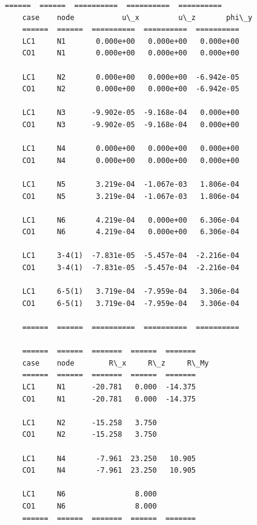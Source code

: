 \begin{Verbatim}[commandchars=\\\{\}]
    ======  ======  ==========  ==========  ==========
    case    node           u\_x         u\_z       phi\_y
    ======  ======  ==========  ==========  ==========
    LC1     N1       0.000e+00   0.000e+00   0.000e+00
    CO1     N1       0.000e+00   0.000e+00   0.000e+00

    LC1     N2       0.000e+00   0.000e+00  -6.942e-05
    CO1     N2       0.000e+00   0.000e+00  -6.942e-05
    
    LC1     N3      -9.902e-05  -9.168e-04   0.000e+00
    CO1     N3      -9.902e-05  -9.168e-04   0.000e+00

    LC1     N4       0.000e+00   0.000e+00   0.000e+00
    CO1     N4       0.000e+00   0.000e+00   0.000e+00
    
    LC1     N5       3.219e-04  -1.067e-03   1.806e-04
    CO1     N5       3.219e-04  -1.067e-03   1.806e-04
    
    LC1     N6       4.219e-04   0.000e+00   6.306e-04
    CO1     N6       4.219e-04   0.000e+00   6.306e-04
        
    LC1     3-4(1)  -7.831e-05  -5.457e-04  -2.216e-04
    CO1     3-4(1)  -7.831e-05  -5.457e-04  -2.216e-04
    
    LC1     6-5(1)   3.719e-04  -7.959e-04   3.306e-04
    CO1     6-5(1)   3.719e-04  -7.959e-04   3.306e-04

    ======  ======  ==========  ==========  ==========

    ======  ======  =======  ======  =======
    case    node        R\_x     R\_z     R\_My
    ======  ======  =======  ======  =======
    LC1     N1      -20.781   0.000  -14.375
    CO1     N1      -20.781   0.000  -14.375
     
    LC1     N2      -15.258   3.750
    CO1     N2      -15.258   3.750

    LC1     N4       -7.961  23.250   10.905
    CO1     N4       -7.961  23.250   10.905

    LC1     N6                8.000
    CO1     N6                8.000
    ======  ======  =======  ======  =======
        \end{Verbatim}
    

